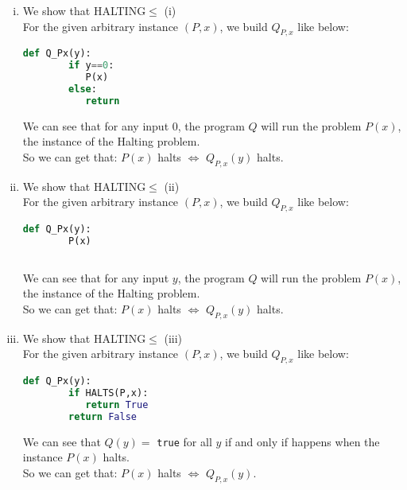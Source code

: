 \begin{solution}
\begin{enumerate}[(i)]
    \item We show that HALTING$\leq$ (i)\\
    For the given arbitrary instance $(P, x)$, we build $Q_{P,x}$ like below:
    \begin{lstlisting}[language=python]
    def Q_Px(y):
        if y==0:
           P(x)
        else:
           return
    \end{lstlisting}
    We can see that for any input 0, the program $Q$ will run the problem $P(x)$, the instance of the Halting problem.\\
    So we can get that: $P(x)$ halts $\Leftrightarrow$ $Q_{P,x}(y)$ halts.
    \item We show that HALTING$\leq$ (ii)\\
    For the given arbitrary instance $(P, x)$, we build $Q_{P,x}$ like below:
    \begin{lstlisting}[language=python]
    def Q_Px(y):
        P(x)
        
    \end{lstlisting}
    We can see that for any input $y$, the program $Q$ will run the problem $P(x)$, the instance of the Halting problem.\\
    So we can get that: $P(x)$ halts $\Leftrightarrow$ $Q_{P,x}(y)$ halts.
    \item We show that HALTING$\leq$ (iii)\\
    For the given arbitrary instance $(P, x)$, we build $Q_{P,x}$ like below:
    \begin{lstlisting}[language=python]
    def Q_Px(y):
        if HALTS(P,x):
           return True
        return False
    \end{lstlisting}
    We can see that $Q(y)=$ {\tt true} for all $y$ if and only if happens when the instance $P(x)$ halts.\\
    So we can get that: $P(x)$ halts $\Leftrightarrow$ $Q_{P,x}(y)$.

\end{enumerate}

\end{solution}


